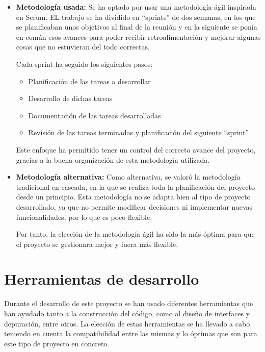 \begin{itemize}
    \item \textbf{Metodología usada:} Se ha optado por usar una metodología ágil inspirada en Scrum. EL trabajo se ha dividido en ``sprints'' de dos semanas, en los que se planificaban unos objetivos al final de la reunión y en la siguiente se ponía en común esos avances para poder recibir retroalimentación y mejorar algunas cosas que no estuvieran del todo correctas.
    
    Cada sprint ha seguido los siguientes pasos:
    \begin{itemize}
        \item Planificación de las tareas a desarrollar
        \item Desarrollo de dichas tareas
        \item Documentación de las tareas desarrolladas
        \item Revisión de las tareas terminadas y planificación del siguiente ``sprint''
    \end{itemize}

    Este enfoque ha permitido tener un control del correcto avance del proyecto, gracias a la buena organización de esta metodología utilizada.

    \item \textbf{Metodología alternativa:} Como alternativa, se valoró la metodología tradicional en cascada, en la que se realiza toda la planificación del proyecto desde un principio. Esta metodología no se adapta bien al tipo de proyecto desarrollado, ya que no permite modificar decisiones ni implementar nuevas funcionalidades, por lo que es poco flexible.

    Por tanto, la elección de la metodología ágil ha sido la más óptima para que el proyecto se gestionara mejor y fuera más flexible.
\end{itemize}


\section{Herramientas de desarrollo}

Durante el desarrollo de este proyecto se han usado diferentes herramientas que han ayudado tanto a la construcción del código, como al diseño de interfaces y depuración, entre otros. La elección de estas herramientas se ha llevado a cabo teniendo en cuenta la compatibilidad entre las mismas y lo óptimas que son para este tipo de proyecto en concreto. 

